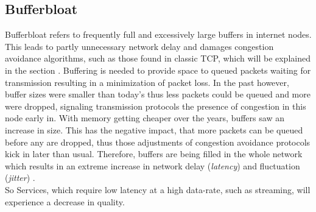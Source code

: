 \documentclass[a4paper,conference]{IEEEtran}
\begin{document}
\subsection*{Bufferbloat}
Bufferbloat refers to frequently full and excessively large buffers in internet nodes. This leads to partly unnecessary network delay and damages congestion avoidance algorithms, such as those found in classic TCP, which will be explained in the section  \cite{gettys2012bufferbloat,chen2014bufferbloat}. Buffering is needed to provide space to queued packets waiting for transmission resulting in a minimization of packet loss. In the past however, buffer sizes were smaller than today's thus less packets could be queued and more were dropped, signaling transmission protocols the presence of congestion in this node early in. With memory getting cheaper over the years, buffers saw an increase in size. This has the negative impact, that more packets can be queued before any are dropped, thus those adjustments of congestion avoidance protocols kick in later than usual. Therefore, buffers are being filled in the whole network which results in an extreme increase in network delay (\textit{latency}) and fluctuation (\textit{jitter}) \cite{gettys2012bufferbloat,staff2012bufferbloat,chen2014bufferbloat}.
\\So Services, which require low latency at a high data-rate, such as streaming, will experience a decrease in quality.
\end{document}
